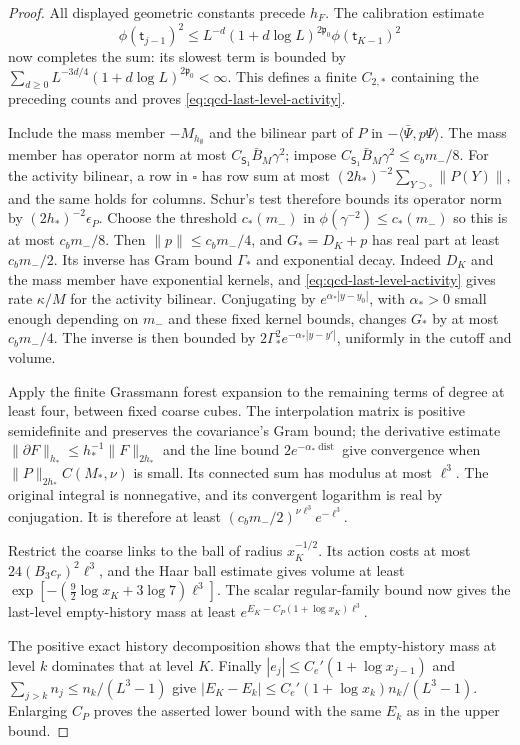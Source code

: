 \documentclass[11pt,letterpaper,reqno]{amsart}
\theoremstyle{definition}
\theoremstyle{remark}
\begin{document}
\begin{proof}
All displayed geometric constants precede $h_F$. The
calibration estimate
\[
 \phi(\mathsf t_{j-1})^2
 \le L^{-d}(1+d\log L)^{2\mathfrak p_0}
                         \phi(\mathsf t_{K-1})^2
\]
now completes the sum: its slowest term is bounded by
$\sum_{d\ge0}L^{-3d/4}(1+d\log L)^{2\mathfrak p_0}<\infty$.
This defines a finite $C_{2,*}$ containing the preceding
counts and proves \eqref{eq:qcd-last-level-activity}.

Include the mass member $-M_{h_\emptyset}$ and the bilinear
part of $P$ in $-\langle\bar\Psi,p\Psi\rangle$.
The mass member has operator norm at most
$C_{\mathsf S_1}\bar B_M\gamma^2$; impose
$C_{\mathsf S_1}\bar B_M\gamma^2\le c_bm_-/8$.
For the activity bilinear, a row in $\square$ has row
sum at most $(2h_*)^{-2}\sum_{Y\supset\square}\|P(Y)\|$,
and the same holds for columns. Schur's test therefore
bounds its operator norm by $(2h_*)^{-2}\epsilon_P$.
Choose the threshold $c_*(m_-)$ in
$\phi(\gamma^{-2})\le c_*(m_-)$ so this is at most
$c_bm_-/8$. Then $\|p\|\le c_bm_-/4$, and
$G_*=D_K+p$ has real part at least $c_bm_-/2$.
Its inverse has Gram bound $\Gamma_*$ and exponential
decay. Indeed $D_K$ and the mass member have exponential
kernels, and \eqref{eq:qcd-last-level-activity} gives rate
$\kappa/M$ for the activity bilinear. Conjugating by
$e^{\alpha_*|y-y_0|}$, with $\alpha_*>0$ small enough
depending on $m_-$ and these fixed kernel bounds, changes
$G_*$ by at most $c_bm_-/4$. The inverse is then bounded
by $2\Gamma_*^2e^{-\alpha_*|y-y'|}$, uniformly in the
cutoff and volume.

Apply the finite Grassmann forest expansion to the remaining
terms of degree at least four, between fixed coarse cubes.
The interpolation matrix is positive semidefinite and
preserves the covariance's Gram bound; the derivative estimate
$\|\partial F\|_{h_*}\le h_*^{-1}\|F\|_{2h_*}$ and the
line bound $2e^{-\alpha_*\operatorname{dist}}$ give convergence
when $\|P\|_{2h_*}C(M_*,\nu)$ is small. Its connected sum
has modulus at most $\ell^3$. The original integral is
nonnegative, and its convergent logarithm is real by
conjugation. It is therefore at least
$(c_bm_-/2)^{\nu\ell^3}e^{-\ell^3}$.

Restrict the coarse links to the ball of radius $x_K^{-1/2}$.
Its action costs at most $24(B_3c_r)^2\ell^3$, and the Haar
ball estimate gives volume at least
$\exp[-(\frac92\log x_K+3\log7)\ell^3]$.
The scalar regular-family bound now gives the last-level
empty-history mass at least
$e^{E_K-C_P(1+\log x_K)\ell^3}$.

The positive exact history decomposition shows that the
empty-history mass at level $k$ dominates that at level $K$.
Finally $|e_j|\le C_e'(1+\log x_{j-1})$ and
$\sum_{j>k}n_j\le n_k/(L^3-1)$ give
$|E_K-E_k|\le C_e'(1+\log x_k)n_k/(L^3-1)$.
Enlarging $C_P$ proves the asserted lower bound with the
same $E_k$ as in the upper bound.
\end{proof}
\end{document}

